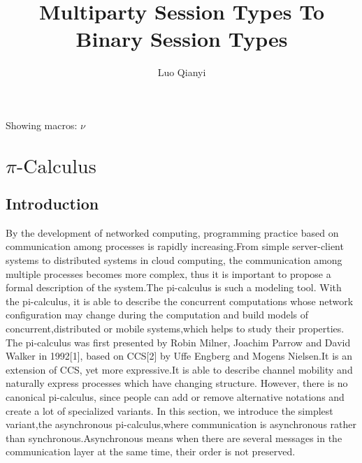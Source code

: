 \documentclass[a4paper]{article}
\title{Multiparty Session Types To Binary Session Types}
\author{Luo Qianyi}
\newcommand{\newa}{\nu}
\begin{document}
\maketitle

Showing macros: $\newa$

\section{\(\pi\mbox{-Calculus}\)}
\subsection{Introduction}
By the development of networked computing, programming practice based on communication among processes is rapidly increasing.From simple server-client systems to distributed systems in cloud computing, the communication among multiple processes becomes more complex, thus it is important to propose a formal description of the system.The pi-calculus is such a modeling tool. With the pi-calculus, it is able to describe the concurrent computations whose network configuration may change during the computation and build models of concurrent,distributed or mobile systems,which helps to study their properties.
The pi-calculus was first presented by Robin Milner, Joachim Parrow and David Walker in 1992[1], based on CCS[2] by Uffe Engberg and Mogens Nielsen.It is an extension of CCS, yet more expressive.It is able to describe channel mobility and naturally express processes which have changing structure. However, there is no canonical pi-calculus, since people can add or remove alternative notations and create a lot of specialized variants. In this section, we introduce the simplest variant,the asynchronous pi-calculus,where communication is asynchronous rather than synchronous.Asynchronous means when there are several messages in the communication layer at the same time, their order is not preserved.
\end{document}
